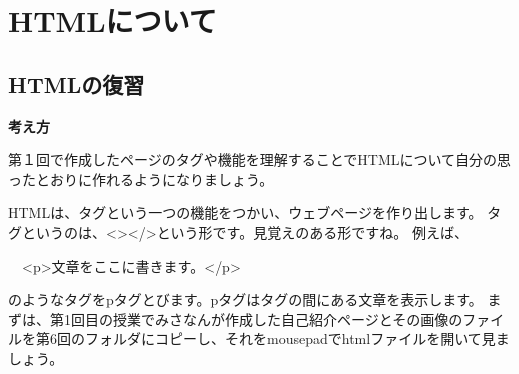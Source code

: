 %
%
\section{HTMLについて}
\label{P:HTML}

%
%
\subsection{HTMLの復習\label{E:HTML}}

\bigskip

{\bfseries 考え方}

第１回で作成したページのタグや機能を理解することでHTMLについて自分の思ったとおりに作れるようになりましょう。



HTMLは、タグという一つの機能をつかい、ウェブページを作り出します。\newline
タグというのは、{\textless}{\textgreater}{\textless}/{\textgreater}という形です。見覚えのある形ですね。\newline
例えば、

\ \ {\textless}p{\textgreater}文章をここに書きます。{\textless}/p{\textgreater}

のようなタグをpタグとびます。pタグはタグの間にある文章を表示します。\newline
まずは、第1回目の授業でみさなんが作成した自己紹介ページとその画像のファイルを第6回のフォルダにコピーし、それをmousepadでhtmlファイルを開いて見ましょう。

